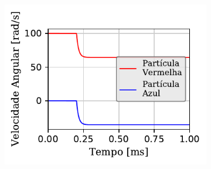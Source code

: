 \begin{figure}[H]
{		\begin{subfigure}[t]{\smallresultsfigwidth}
			\centering
			\includegraphics[scale=1]{images/colliding_spheres/dissipative_rotation/AngularVelocity-Z_small_alternative.pdf}
			\caption{}
			\label{subfig:colliding_spheres:dissipative_rotation:z_angular_velocity}
		\end{subfigure}
	}
	\label{fig:colliding_spheres:dissipative_rotation:kinematic_results}
	\sourceMe
\end{figure}

